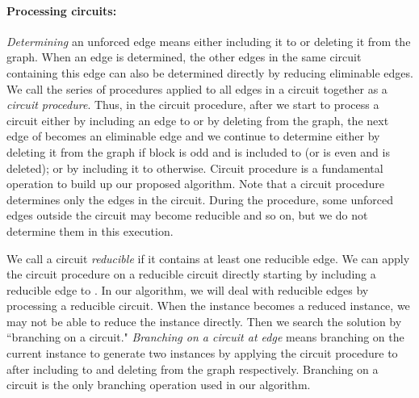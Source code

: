 \documentclass[runningheads]{llncs}
\begin{document}
\paragraph{Processing circuits:}
\emph{Determining} an unforced edge means either including it to  or deleting it from the graph.
 When an edge is determined, the other edges in the same circuit containing this edge can also be determined directly by reducing eliminable edges. We call the series of procedures applied to all edges in a circuit together as a \emph{circuit procedure}.
Thus, in the circuit procedure, after we start to process a circuit  either by including an edge  to 
 or by deleting  from the graph, the next edge  of  becomes an eliminable edge and we continue to determine 
either by deleting it  from the graph if block  is odd and 
 is included to  (or  is even and  is deleted);
or  by including it to  otherwise.
Circuit procedure is a fundamental operation
 to build up our proposed algorithm. Note that a circuit procedure determines only the edges in the circuit.
During the procedure, some unforced edges outside the circuit may become reducible  and so on,
 but we do not determine them in this execution.

\bigskip


We call a circuit \emph{reducible} if it contains at least one reducible edge.
We can apply the circuit procedure on a reducible circuit directly starting by including a reducible edge to .
In our algorithm, we will deal with reducible edges
by processing a reducible circuit.
When the instance becomes a reduced instance, we may not be able to reduce the instance directly.
Then we search the solution by ``branching on a circuit."
\emph{Branching on a circuit  at edge } means branching on the current instance to generate
 two instances by applying the circuit procedure to  after including  to  and deleting  from the graph respectively.
Branching on a circuit is the only branching operation used in our algorithm.
\end{document}
